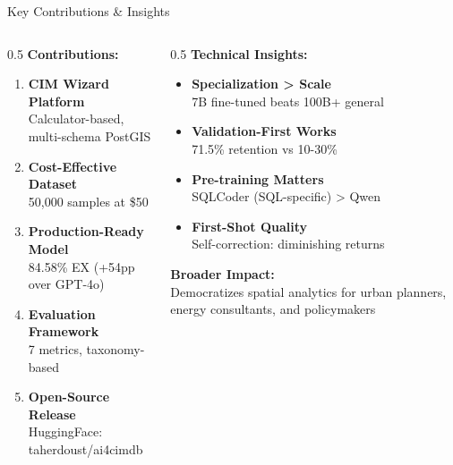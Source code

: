 \documentclass{beamer}
\begin{document}
\begin{frame}{Key Contributions \& Insights}
\begin{columns}
\begin{column}{0.5\textwidth}
\textbf{Contributions:}
\begin{enumerate}
    \item \textbf{CIM Wizard Platform}\\
    {\small Calculator-based, multi-schema PostGIS}
    
    \item \textbf{Cost-Effective Dataset}\\
    {\small 50,000 samples at \$50}
    
    \item \textbf{Production-Ready Model}\\
    {\small 84.58\% EX (+54pp over GPT-4o)}
    
    \item \textbf{Evaluation Framework}\\
    {\small 7 metrics, taxonomy-based}
    
    \item \textbf{Open-Source Release}\\
    {\small HuggingFace: taherdoust/ai4cimdb}
\end{enumerate}
\end{column}
\begin{column}{0.5\textwidth}
\textbf{Technical Insights:}
\begin{itemize}
    \item \textbf{Specialization > Scale}\\
    7B fine-tuned beats 100B+ general
    
    \item \textbf{Validation-First Works}\\
    71.5\% retention vs 10-30\%
    
    \item \textbf{Pre-training Matters}\\
    SQLCoder (SQL-specific) > Qwen
    
    \item \textbf{First-Shot Quality}\\
    Self-correction: diminishing returns
\end{itemize}

\vspace{0.3cm}
\textbf{Broader Impact:}\\
Democratizes spatial analytics for urban planners, energy consultants, and policymakers
\end{column}
\end{columns}
\end{frame}
\end{document}
